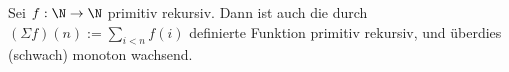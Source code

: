 
\begin{exercise}[196]

Sei $f: \N \to \N$ primitiv rekursiv. Dann ist auch die durch
$(\Sigma f)(n) := \sum_{i < n} f(i)$ definierte Funktion primitiv rekursiv,
und überdies (schwach) monoton wachsend.

\end{exercise}


\begin{solution}

  \phantom{}

\end{solution}
